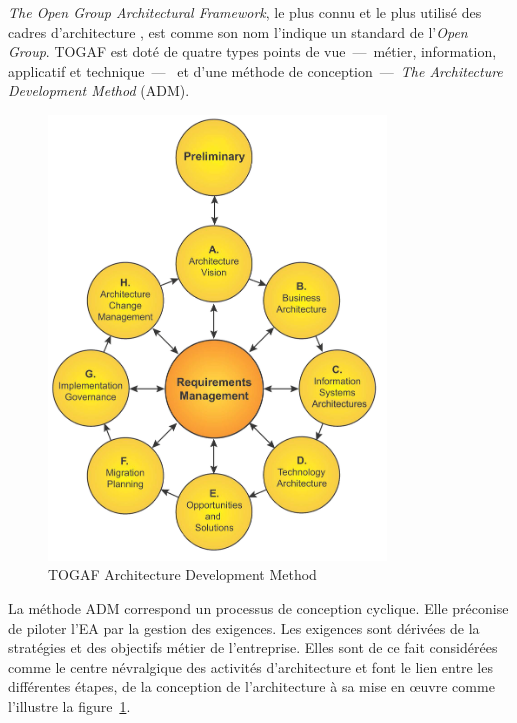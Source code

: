 \textit{The Open Group Architectural Framework}, le plus connu et le plus utilisé des cadres d'architecture \cite{winter2008enterprise}, est comme son nom l'indique un standard de l'\textit{Open Group}. TOGAF est doté de quatre types points de vue~—~métier, information, applicatif et technique~—~  et d'une méthode de conception~—~\textit{The Architecture Development Method} (ADM). 

\begin{figure}[!htbp]
 \begin{center}
  \includegraphics[width=0.8\textwidth]{figures/images/Chapitre1/TOGAF9_Wheel.png}
 \end{center}
 \caption{TOGAF Architecture Development Method  \protect\cite{togaf2009}}
 \label{fig:TOGAF}
\end{figure}

La méthode ADM correspond un processus de conception cyclique. Elle préconise de piloter l'EA par la gestion des exigences. Les exigences sont dérivées de la stratégies et des objectifs métier de l'entreprise. Elles sont de ce fait considérées comme le centre névralgique des activités d'architecture et font le lien entre les différentes étapes, de la conception de l'architecture à sa mise en œuvre comme l'illustre la figure~\ref{fig:TOGAF}. 

